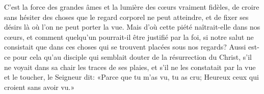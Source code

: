 C’est la force des grandes âmes et la lumière des cœurs vraiment fidèles,
	de croire sans hésiter des choses que le regard corporel ne peut atteindre,
	et de fixer ses désirs là où l’on ne peut porter la vue.
Mais d’où cette piété naîtrait-elle dans nos cœurs,
	et comment quelqu’un pourrait-il être justifié par la foi,
	si notre salut ne consistait
		que dans ces choses qui se trouvent placées sous nos regards?
Aussi est-ce pour cela qu’au disciple
		qui semblait douter de la résurrection du Christ,
	s’il ne voyait dans sa chair les traces de ses plaies,
	et s’il ne les constatait par la vue et le toucher,
	le Seigneur dit: «Parce que tu m’as vu, tu as cru;
	Heureux ceux qui croient sans avoir vu.»
